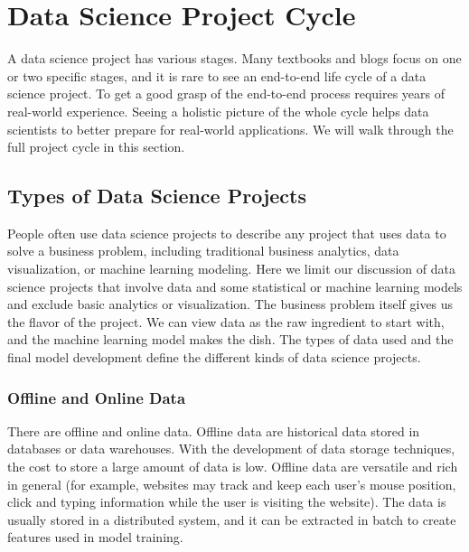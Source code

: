 \documentclass[12pt,]{krantz}
\begin{document}
\hypertarget{data-science-project-cycle}{%
\section{Data Science Project Cycle}\label{data-science-project-cycle}}

A data science project has various stages. Many textbooks and blogs focus on one or two specific stages, and it is rare to see an end-to-end life cycle of a data science project. To get a good grasp of the end-to-end process requires years of real-world experience. Seeing a holistic picture of the whole cycle helps data scientists to better prepare for real-world applications. We will walk through the full project cycle in this section.

\hypertarget{types-of-data-science-projects}{%
\subsection{Types of Data Science Projects}\label{types-of-data-science-projects}}

People often use data science projects to describe any project that uses data to solve a business problem, including traditional business analytics, data visualization, or machine learning modeling. Here we limit our discussion of data science projects that involve data and some statistical or machine learning models and exclude basic analytics or visualization. The business problem itself gives us the flavor of the project. We can view data as the raw ingredient to start with, and the machine learning model makes the dish. The types of data used and the final model development define the different kinds of data science projects.

\hypertarget{offline-and-online-data}{%
\subsubsection{Offline and Online Data}\label{offline-and-online-data}}

There are offline and online data. Offline data are historical data stored in databases or data warehouses. With the development of data storage techniques, the cost to store a large amount of data is low. Offline data are versatile and rich in general (for example, websites may track and keep each user's mouse position, click and typing information while the user is visiting the website). The data is usually stored in a distributed system, and it can be extracted in batch to create features used in model training.
\end{document}
